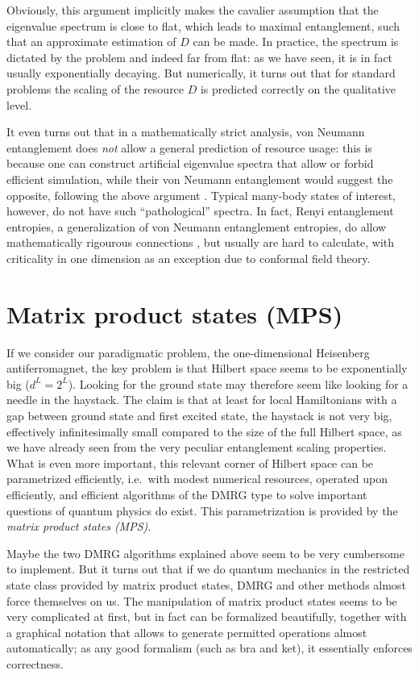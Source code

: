 Obviously, this argument implicitly makes the cavalier assumption that the eigenvalue spectrum is close to flat, which leads to maximal entanglement, such that an approximate estimation of $D$ can be made. In practice, the spectrum is dictated by the problem and indeed far from flat: as we have seen, it is in fact usually exponentially decaying. But numerically, it turns out that for standard problems the scaling of the resource $D$ is predicted correctly on the qualitative level. 

It even turns out that in a mathematically strict analysis, von Neumann entanglement does {\em not} allow a general prediction of resource usage: this is because one can construct artificial eigenvalue spectra that allow or forbid efficient simulation, while their von Neumann entanglement would suggest the opposite, following the above argument \cite{Schuch08}. Typical many-body states of interest, however, do not have such ``pathological'' spectra. In fact, Renyi entanglement entropies, a generalization of von Neumann entanglement entropies, do allow mathematically rigourous connections \cite{Schuch08}, but usually are hard to calculate, with criticality in one dimension as an exception due to conformal field theory.  

\section{Matrix product states (MPS)}
\label{sec:matrixproductstates}

If we consider our paradigmatic problem, the one-dimensional Heisenberg antiferromagnet, the key problem is that Hilbert space seems to be exponentially big ($d^L = 2^L$). Looking for the ground state may therefore seem like looking for a needle in the haystack. The claim is that at least for local Hamiltonians with a gap between ground state and first excited state, the haystack is not very big, effectively infinitesimally small compared to the size of the full Hilbert space, as we have already seen from the very peculiar entanglement scaling properties. What is even more important, this relevant corner of Hilbert space can be parametrized efficiently, i.e.\ with modest numerical resources, operated upon efficiently, and efficient algorithms of the DMRG type to solve important questions of quantum physics do exist. This parametrization is provided by the {\em matrix product states (MPS)}.

Maybe the two DMRG algorithms explained above seem to be very cumbersome to implement. But it turns out that if we do quantum mechanics in the restricted state class provided by matrix product states, DMRG and other methods almost force themselves on us. The manipulation of matrix product states seems to be very complicated at first, but in fact can be formalized beautifully, together with a graphical notation that allows to generate permitted operations almost automatically; as any good formalism (such as bra and ket), it essentially enforces correctness. 

